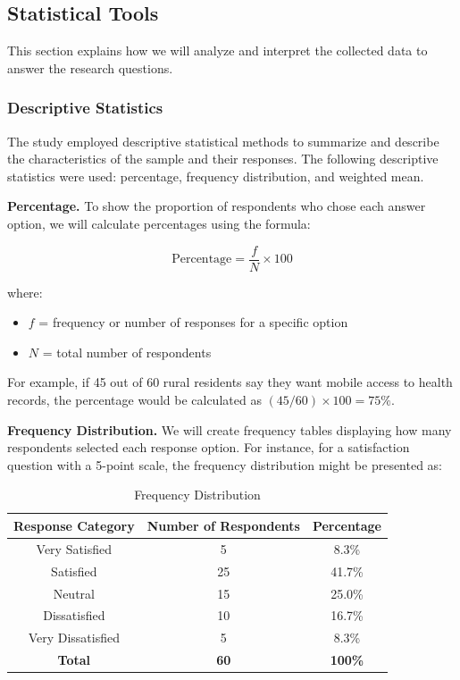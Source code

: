 \documentclass{research}
\begin{document}
\subsection{Statistical Tools}

This section explains how we will analyze and interpret the collected data to answer 
the research questions.

\subsubsection{Descriptive Statistics}

The study employed descriptive statistical methods to summarize and describe the 
characteristics of the sample and their responses. The following descriptive 
statistics were used: percentage, frequency distribution, and weighted mean.

\textbf{Percentage.} To show the proportion of respondents who chose each answer 
option, we will calculate percentages using the formula:

\begin{equation*}
    \text{Percentage} = \frac{f}{N} \times 100
\end{equation*}

\noindent where:
\begin{itemize}[label={}, leftmargin=0pt, itemsep=0pt]
    \item $f$ = frequency or number of responses for a specific option
    \item $N$ = total number of respondents
\end{itemize}

For example, if 45 out of 60 rural residents say they want mobile access to health 
records, the percentage would be calculated as $(45/60) \times 100 = 75\%$.

\textbf{Frequency Distribution.} We will create frequency tables displaying how many 
respondents selected each response option. For instance, for a satisfaction question 
with a 5-point scale, the frequency distribution might be presented as:

\begin{table}[h]
    \centering
    \caption{Frequency Distribution}
    \label{tab:frequency_distribution}
    \begin{tabular}{ccc} %
        \toprule
        \textbf{Response Category} & \textbf{Number of Respondents} & \textbf{Percentage} \\
        \midrule %
        Very Satisfied      & 5  & 8.3\%  \\ 
        Satisfied           & 25 & 41.7\% \\ 
        Neutral             & 15 & 25.0\% \\ 
        Dissatisfied        & 10 & 16.7\% \\ 
        Very Dissatisfied   & 5  & 8.3\%  \\
        \textbf{Total}      & \textbf{60} & \textbf{100\%} \\
        \bottomrule %
    \end{tabular}
\end{table}
\end{document}
